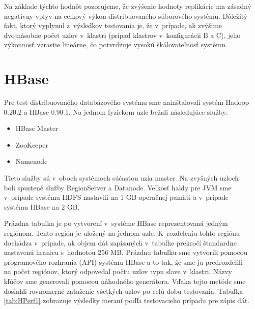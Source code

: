 \documentclass[11pt,twoside,a4paper]{book}
\begin{document}
% 
% 

Na základe týchto hodnôt pozorujeme, že zvýšenie hodnoty replikácie ma zásadný negatívny vplyv na celkový výkon distribuovaného súborového systému. Dôležitý fakt, ktorý vyplynul z~výsledkov testovania je, že v~prípade, ak zvýšime dvojnásobne počet uzlov v~klastri (prípad klastrov v~konfigurácii B a C), jeho výkonnosť vzrastie lineárne, čo potvrdzuje vysokú škálovateľnosť systému. 


\section{HBase}

Pre test distribuovaného databázového systému sme nainštalovali systém Hadoop 0.20.2 a HBase 0.90.1. Na jednom fyzickom uzle bežali následujúce služby:

\begin{itemize}
 \item HBase Master
 \item ZooKeeper
 \item Namenode 
\end{itemize}

Tieto služby sú v~oboch systémoch súčasťou uzla master. Na zvyšných uzloch boli spustené služby RegionServer a Datanode. Veľkosť haldy pre JVM sme v~prípade systému HDFS nastavili na 1 GB operačnej pamäti a v~prípade systému HBase na 2 GB.

Prázdna tabuľka je po vytvorení v~systéme HBase reprezentovaná  jedným regiónom. Tento región je uložený na jednom uzle. K~rozdeleniu tohto regiónu dochádza v~prípade, ak objem dát zapísaných v~tabuľke prekročí štandardne nastavenú hranicu s~hodnotou 256 MB. Prázdnu tabuľku sme vytvorili pomocou programového rozhrania (API) systému HBase a to tak, že sme ju predrozdelili na počet regiónov, ktorý odpovedal počtu uzlov typu slave v~klastri. Názvy kľúčov sme generovali pomocou náhodného generátora. Vďaka tejto metóde sme dosiahli rovnomerné zaťaženie všetkých uzlov po celú dobu testovania. Tabuľka \ref{tab:HPerf1} zobrazuje výsledky meraní podľa testovacieho prípadu pre zápis dát. 
\end{document}
